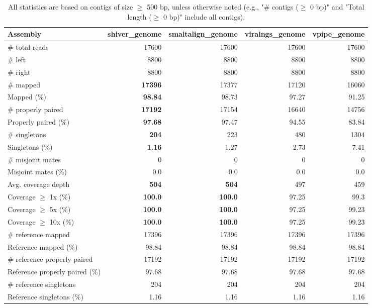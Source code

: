 \documentclass[12pt,a4paper]{article}
\begin{document}
\begin{table}[ht]
\begin{center}
\caption{All statistics are based on contigs of size $\geq$ 500 bp, unless otherwise noted (e.g., "\# contigs ($\geq$ 0 bp)" and "Total length ($\geq$ 0 bp)" include all contigs).}
\begin{tabular}{|l*{4}{|r}|}
\hline
Assembly & shiver\_genome & smaltalign\_genome & viralngs\_genome & vpipe\_genome \\ \hline
\# total reads & 17600 & 17600 & 17600 & 17600 \\ \hline
\# left & 8800 & 8800 & 8800 & 8800 \\ \hline
\# right & 8800 & 8800 & 8800 & 8800 \\ \hline
\# mapped & {\bf 17396} & 17377 & 17120 & 16060 \\ \hline
Mapped (\%) & {\bf 98.84} & 98.73 & 97.27 & 91.25 \\ \hline
\# properly paired & {\bf 17192} & 17154 & 16640 & 14756 \\ \hline
Properly paired (\%) & {\bf 97.68} & 97.47 & 94.55 & 83.84 \\ \hline
\# singletons & {\bf 204} & 223 & 480 & 1304 \\ \hline
Singletons (\%) & {\bf 1.16} & 1.27 & 2.73 & 7.41 \\ \hline
\# misjoint mates & 0 & 0 & 0 & 0 \\ \hline
Misjoint mates (\%) & 0.0 & 0.0 & 0.0 & 0.0 \\ \hline
Avg. coverage depth & {\bf 504} & {\bf 504} & 497 & 459 \\ \hline
Coverage $\geq$ 1x (\%) & {\bf 100.0} & {\bf 100.0} & 97.25 & 99.3 \\ \hline
Coverage $\geq$ 5x (\%) & {\bf 100.0} & {\bf 100.0} & 97.25 & 99.23 \\ \hline
Coverage $\geq$ 10x (\%) & {\bf 100.0} & {\bf 100.0} & 97.25 & 99.23 \\ \hline
\# reference mapped & 17396 & 17396 & 17396 & 17396 \\ \hline
Reference mapped (\%) & 98.84 & 98.84 & 98.84 & 98.84 \\ \hline
\# reference properly paired & 17192 & 17192 & 17192 & 17192 \\ \hline
Reference properly paired (\%) & 97.68 & 97.68 & 97.68 & 97.68 \\ \hline
\# reference singletons & 204 & 204 & 204 & 204 \\ \hline
Reference singletons (\%) & 1.16 & 1.16 & 1.16 & 1.16 \\ \hline

\end{tabular}
\end{center}
\end{table}
\end{document}
